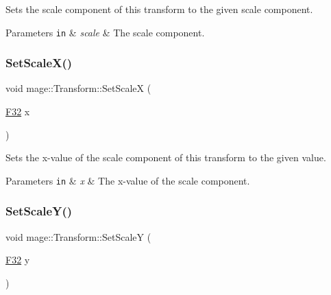 Sets the scale component of this transform to the given scale component.


\begin{DoxyParams}[1]{Parameters}
\mbox{\tt in}  & {\em scale} & The scale component. \\
\hline
\end{DoxyParams}
\hypertarget{structmage_1_1_transform_a6adbe2205f8db80107a2046eb7a9566a}{}\label{structmage_1_1_transform_a6adbe2205f8db80107a2046eb7a9566a} 
\subsubsection{\texorpdfstring{Set\+Scale\+X()}{SetScaleX()}}
{\footnotesize\ttfamily void mage\+::\+Transform\+::\+Set\+ScaleX (\begin{DoxyParamCaption}\item[{\hyperlink{namespacemage_aa97e833b45f06d60a0a9c4fc22ae02c0}{F32}}]{x }\end{DoxyParamCaption})\hspace{0.3cm}{\ttfamily [noexcept]}}

Sets the x-\/value of the scale component of this transform to the given value.


\begin{DoxyParams}[1]{Parameters}
\mbox{\tt in}  & {\em x} & The x-\/value of the scale component. \\
\hline
\end{DoxyParams}
\hypertarget{structmage_1_1_transform_a953a89b7f7ed2ec47eb05074d43e35c6}{}\label{structmage_1_1_transform_a953a89b7f7ed2ec47eb05074d43e35c6} 
\subsubsection{\texorpdfstring{Set\+Scale\+Y()}{SetScaleY()}}
{\footnotesize\ttfamily void mage\+::\+Transform\+::\+Set\+ScaleY (\begin{DoxyParamCaption}\item[{\hyperlink{namespacemage_aa97e833b45f06d60a0a9c4fc22ae02c0}{F32}}]{y }\end{DoxyParamCaption})\hspace{0.3cm}{\ttfamily [noexcept]}}

